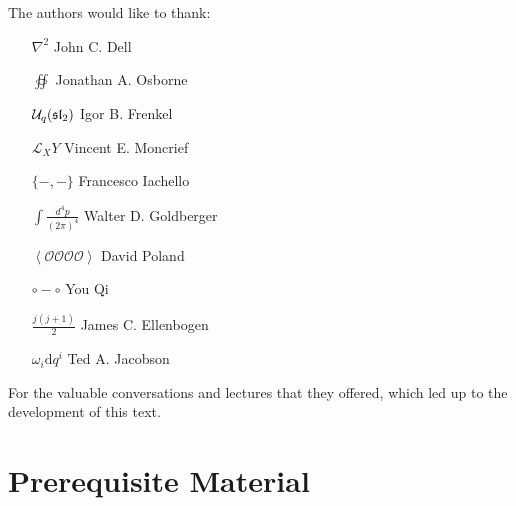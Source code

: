 \documentclass[12pt, twoside, openany]{book}
\newcommand{\1}{\mathbbm{1}}
\theoremstyle{definition}
\begin{document}
\begin{large}
	
		

	The authors would like to thank:
	\vspace{.5cm}
	\begin{center}
	\begin{varwidth}{\textwidth}
			\begin{itemize} 
				\renewcommand\labelitemi{$\square$}
				\setlength\itemsep{.2em}
				\item[$\nabla^2$] John C. Dell
				\item[$\oiint$] Jonathan A. Osborne
				\item[$\mathcal U_q(\frak{sl}_2)$] Igor B. Frenkel
				\item[$\mathcal L_X Y$] Vincent E. Moncrief
				\item[$\{-,- \}$] Francesco Iachello
				\item[$\int \frac{d^4 p}{(2\pi)^4}$] Walter D. Goldberger
				\item[$\left< \mathcal O \mathcal O \mathcal O \mathcal O \right>$] David Poland
				\item[$\circ - \circ$] You Qi
				\item[$\frac{j(j+1)}{2}$] James C. Ellenbogen
				\item[$\omega_i \mathrm d q^i$] Ted A. Jacobson
			\end{itemize}
	\end{varwidth}
	\end{center}
	\vspace{.5cm}
	For the valuable conversations and lectures that they offered, which led up to the development of this text.
	
\end{large}

\newpage

\setcounter{page}{1}

\part{Prerequisite Material}






\end{document}
